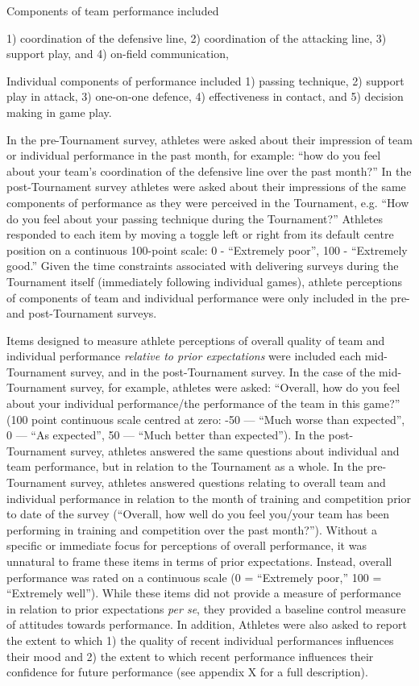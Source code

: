 Components of team performance included

1) coordination of the defensive line,
2) coordination of the attacking line,
3) support play, and
4) on-field communication,

Individual components of performance included
1) passing technique,
2) support play in attack,
3) one-on-one defence,
4) effectiveness in contact, and
5) decision making in game play.

In the pre-Tournament survey, athletes were asked about their impression of team or individual performance in the past month, for example: ``how do you feel about your team's coordination of the defensive line over the past month?''  In the post-Tournament survey athletes were asked about their impressions of the same components of performance as they were perceived in the Tournament, e.g. ``How do you feel about your passing technique during the Tournament?'' Athletes responded to each item by moving a toggle left or right from its default centre position on a continuous 100-point scale: 0 - ``Extremely poor'', 100 - ``Extremely good.''  Given the time constraints associated with delivering surveys during the Tournament itself (immediately following individual games), athlete perceptions of components of team and individual performance were only included in the pre- and post-Tournament surveys.

Items designed to measure athlete perceptions of overall quality of team and individual performance \textit{relative to prior expectations} were included each mid-Tournament survey, and in the post-Tournament survey.  In the case of the mid-Tournament survey, for example, athletes were asked: ``Overall, how do you feel about your individual performance/the performance of the team in this game?'' (100 point continuous scale centred at zero: -50 --- ``Much worse than expected'', 0 --- ``As expected'', 50 ---  ``Much better than expected''). In the post-Tournament survey, athletes answered the same questions about individual and team performance, but in relation to the Tournament as a whole. In the pre-Tournament survey, athletes answered questions relating to overall team and individual performance in relation to the month of training and competition prior to date of the survey (``Overall, how well do you feel you/your team has been performing in training and competition over the past month?'').  Without a specific or immediate focus for perceptions of overall performance, it was unnatural to frame these items in terms of prior expectations.  Instead, overall performance was rated on a continuous scale (0 = ``Extremely poor,'' 100 = ``Extremely well'').  While these items did not provide a measure of performance in relation to prior expectations \textit{per se}, they provided a baseline control measure of attitudes towards performance.  In addition, Athletes were also asked to report the extent to which 1) the quality of recent individual performances influences their mood and 2) the extent to which recent performance influences their confidence for future performance (see appendix X for a full description).


